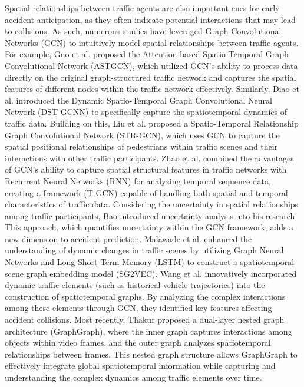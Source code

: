 Spatial relationships between traffic agents are also important cues for early accident anticipation, as they often indicate potential interactions that may lead to collisions. As such, numerous studies \cite{malawade2022spatiotemporal,bao2020uncertainty,guo2019attention,diao2019dynamic,liu2020spatiotemporal,zhao2019t,wang2023gsc,sun2024maformer,thakur2024graph} have leveraged Graph Convolutional Networks (GCN) \cite{kipf2016semi} to intuitively model spatial relationships between traffic agents. For example, Guo et al. \cite{guo2019attention} proposed the Attention-based Spatio-Temporal Graph Convolutional Network (ASTGCN), which utilized GCN's ability to process data directly on the original graph-structured traffic network and captures the spatial features of different nodes within the traffic network effectively. Similarly, Diao et al. \cite{diao2019dynamic} introduced the Dynamic Spatio-Temporal Graph Convolutional Neural Network (DST-GCNN) to specifically capture the spatiotemporal dynamics of traffic data. Building on this, Liu et al. \cite{liu2020spatiotemporal} proposed a Spatio-Temporal Relationship Graph Convolutional Network (STR-GCN), which uses GCN to capture the spatial positional relationships of pedestrians within traffic scenes and their interactions with other traffic participants. Zhao et al. \cite{zhao2019t} combined the advantages of GCN's ability to capture spatial structural features in traffic networks with Recurrent Neural Networks (RNN) \cite{godard2017unsupervised} for analyzing temporal sequence data, creating a framework (T-GCN) capable of handling both spatial and temporal characteristics of traffic data. Considering the uncertainty in spatial relationships among traffic participants, Bao \cite{bao2020uncertainty} introduced uncertainty analysis into his research. This approach, which quantifies uncertainty within the GCN framework, adds a new dimension to accident prediction. Malawade et al. \cite{malawade2022spatiotemporal} enhanced the understanding of dynamic changes in traffic scenes by utilizing Graph Neural Networks and Long Short-Term Memory (LSTM) \cite{shi2015convolutional} to construct a spatiotemporal scene graph embedding model (SG2VEC). Wang et al. \cite{wang2023gsc} innovatively incorporated dynamic traffic elements (such as historical vehicle trajectories) into the construction of spatiotemporal graphs. By analyzing the complex interactions among these elements through GCN, they identified key features affecting accident collisions. Most recently, Thakur \cite{thakur2024graph} proposed a dual-layer nested graph architecture (GraphGraph), where the inner graph captures interactions among objects within video frames, and the outer graph analyzes spatiotemporal relationships between frames. This nested graph structure allows GraphGraph to effectively integrate global spatiotemporal information while capturing and understanding the complex dynamics among traffic elements over time.

